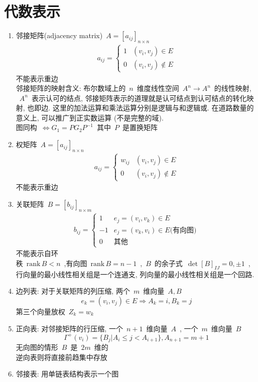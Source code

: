 \documentclass[11pt,a4paper]{article}%
\renewcommand{\[}{~$}
\renewcommand{\]}{$~}%
\newcommand{\rank}{\mathrm{rank}\,}
\begin{document}
\section{代数表示}
	\begin{enumerate}
	 \item 邻接矩阵(adjacency matrix)\[A = [a_{ij}]_{n\times n}\]
	 	\begin{align*}
	 	 a_{ij} = \left\{\begin{array}{rr}
	 	 1 & (v_i,v_j)\in E \\
	 	 0 & (v_i,v_j)\notin E
	 	 \end{array}\right.
	 	\end{align*}
	 	不能表示重边\\
	 	邻接矩阵的映射含义: 布尔数域上的\[n\]维度线性空间\[A^n \to A^n\]的线性映射, \[A^n\]表示认可的结点, 邻接矩阵表示的道理就是认可结点到认可结点的转化映射, 也即边. 这里的加法运算和乘法运算分别是逻辑与和逻辑或. 在道路数量的意义上, 可以推广到正实数运算 (不是完整的域).\\
	 	图同构\[\Leftrightarrow G_1 = P G_2 P^{-1}\]其中\[P\]是置换矩阵
	 \item 权矩阵\[A = [a_{ij}]_{n\times n}\]
	 	\begin{align*}
	 	 a_{ij} = \left\{\begin{array}{cl}
	 	  w_{ij} & (v_i,v_j)\in E \\
	 	  0 & (v_i,v_j)\notin E
	 	 \end{array}\right.
	 	\end{align*}
	 	不能表示重边
	 \item 关联矩阵\[B=[b_{ij}]_{n\times m}\]
	 	\begin{align*}
	 	 b_{ij} = \left\{\begin{array}{cl}
	 	  1 & e_j = (v_i,v_k)\in E \\
	 	  -1 & e_j = (v_k,v_i)\in E \mbox{(有向图)} \\
	 	  0	& \mbox{其他}
	 	 \end{array}\right.
	 	\end{align*}
	 	不能表示自环\\
	 	秩\[\rank B < n\],有向图\[\rank B = n-1\],\[B\]的余子式\[\det[B]_{IJ} = 0,\pm 1\], 行向量的最小线性相关组是一个连通支, 列向量的最小线性相关组是一个回路.
	 \item 边列表: 对于关联矩阵的列压缩, 两个\[m\]维向量\[A,B\]
	 	$$
	 	  e_k = (v_i, v_j )\in E \Rightarrow A_k = i, B_k = j
	 	$$
	 	第三个向量放权\[Z_k = w_k\]
	 \item 正向表: 对邻接矩阵的行压缩, 一个\[n+1\]维向量\[A\], 一个\[m\]维向量\[B\]
	 	$$
	 	  \Gamma^+(v_i) = \{B_j | A_i \le j < A_{i+1}\}, A_{n+1} = m+1
	 	$$
	 	无向图的情形\[B\]是\[2m\]维的\\
	 	逆向表则将直接前趋集中存放
	 \item 邻接表: 用单链表结构表示一个图
	\end{enumerate}
	
\end{document}
